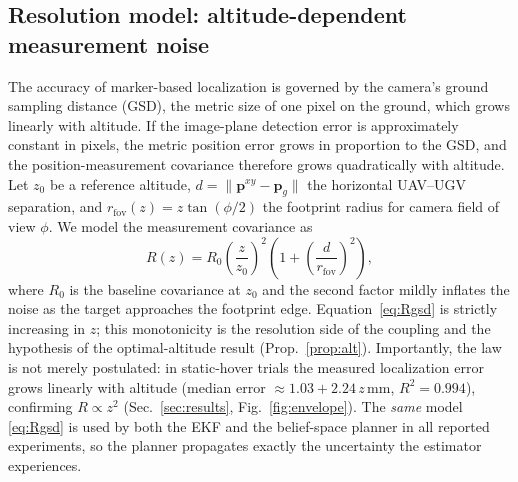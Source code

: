\subsection{Resolution model: altitude-dependent measurement noise}
\label{sec:gsd}
The accuracy of marker-based localization is governed by the camera's ground sampling
distance (GSD), the metric size of one pixel on the ground, which grows linearly with
altitude. If the image-plane detection error is approximately constant in pixels, the
metric position error grows in proportion to the GSD, and the position-measurement
covariance therefore grows quadratically with altitude. Let $z_0$ be a reference
altitude, $d=\lVert\mathbf{p}^{xy}-\mathbf{p}_g\rVert$ the horizontal UAV--UGV
separation, and $r_{\mathrm{fov}}(z)=z\tan(\phi/2)$ the footprint radius for camera
field of view $\phi$. We model the measurement covariance as
\begin{equation}
R(z)=R_0\!\left(\frac{z}{z_0}\right)^{\!2}
\!\left(1+\left(\frac{d}{r_{\mathrm{fov}}}\right)^{\!2}\right),
\label{eq:Rgsd}
\end{equation}
where $R_0$ is the baseline covariance at $z_0$ and the second factor mildly inflates
the noise as the target approaches the footprint edge. Equation~\eqref{eq:Rgsd} is
strictly increasing in $z$; this monotonicity is the resolution side of the coupling
and the hypothesis of the optimal-altitude result (Prop.~\ref{prop:alt}). Importantly,
the law is not merely postulated: in static-hover trials the measured localization
error grows linearly with altitude (median error $\approx 1.03+2.24\,z$\,mm,
$R^2=0.994$), confirming $R\propto z^2$ (Sec.~\ref{sec:results}, Fig.~\ref{fig:envelope}).
The \emph{same} model \eqref{eq:Rgsd} is used by both the EKF and the belief-space
planner in all reported experiments, so the planner propagates exactly the uncertainty
the estimator experiences.

